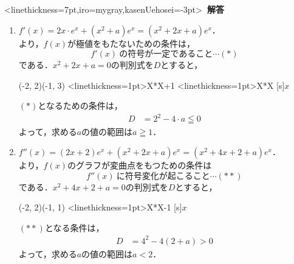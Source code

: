 \documentclass[9pt,
b4paper,
fleqn,
dvipdfmx,
uplatex
]{jsarticle}
\newcommand{\benu}{\begin{enumerate}}
\newcommand{\eenu}{\end{enumerate}}
\newcommand{\bb}{\bf\boldmath}%
\newenvironment{解答}{
\hspace{-2zw}\phkasen<linethickness=7pt,iro=mygray,kasenUehosei=-3pt>{\bf \large \ 解答\ }\vspace{-1zw}\begin{leftbbar}}{\end{leftbbar}}
\newenvironment{leftbbar}{%
\def\FrameCommand{\color{mygray} \vrule width 5pt \hspace{1zw}
\color{black}}%
\MakeFramed {\advance\hsize-\width \FrameRestore}}%
{\endMakeFramed}
\begin{document}
\ifkaitou
\begin{解答}
\benu
\item $f'(x)=2x\cdot e^x+(x^2+a)e^x=(x^2+2x+a)e^x$．\\
より，$f(x)$が極値をもたないための条件は，
\[f'(x)\ の符号が一定であること\cdots(*)\]
である．$x^2+2x+a=0$の判別式を$D$とすると，

\begin{mawarikomi}{}{
\begin{zahyou*}[ul=5mm](-2, 2)(-1, 3)
\YGurafu<linethickness=1pt>{X*X+1}{\xmin}{\xmax}
\YGurafu<linethickness=1pt>{X*X}{\xmin}{\xmax}
[s]{$x$}%
\end{zahyou*}
}
$(*)$となるための条件は，
\begin{align*}
D&=2^2-4\cdot a \leqq 0%
\end{align*}
よって，求める$a$の値の範囲は{\bb $a\geqq 1$}．
\end{mawarikomi}
\item 
$f''(x)=(2x+2)e^x+(x^2+2x+a)e^x=(x^2+4x+2+a)e^x$．\\
より，$f(x)$のグラフが変曲点をもつための条件は
\[f''(x)\ に符号変化が起こること\cdots(**)\]
である．$x^2+4x+2+a=0$の判別式を$D$とすると，

\begin{mawarikomi}{}{
\begin{zahyou*}[ul=5mm](-2, 2)(-1, 1)
\YGurafu<linethickness=1pt>{X*X-1}{\xmin}{\xmax}
[s]{$x$}%
\end{zahyou*}}
$(**)$となる条件は，
\begin{align*}
D&=4^2-4(2+a)>0%
\end{align*}
よって，求める$a$の値の範囲は{\bb $a<2$}．
\end{mawarikomi}
\eenu
\end{解答}
\fi

\vfill


\end{document}
